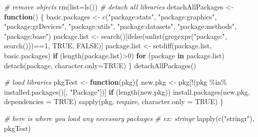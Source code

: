 \documentclass[
]{article}
\newenvironment{Shaded}{\begin{snugshade}}{\end{snugshade}}
\newcommand{\AttributeTok}[1]{\textcolor[rgb]{0.77,0.63,0.00}{#1}}
\newcommand{\CommentTok}[1]{\textcolor[rgb]{0.56,0.35,0.01}{\textit{#1}}}
\newcommand{\ConstantTok}[1]{\textcolor[rgb]{0.00,0.00,0.00}{#1}}
\newcommand{\ControlFlowTok}[1]{\textcolor[rgb]{0.13,0.29,0.53}{\textbf{#1}}}
\newcommand{\DecValTok}[1]{\textcolor[rgb]{0.00,0.00,0.81}{#1}}
\newcommand{\FunctionTok}[1]{\textcolor[rgb]{0.00,0.00,0.00}{#1}}
\newcommand{\NormalTok}[1]{#1}
\newcommand{\OtherTok}[1]{\textcolor[rgb]{0.56,0.35,0.01}{#1}}
\newcommand{\SpecialCharTok}[1]{\textcolor[rgb]{0.00,0.00,0.00}{#1}}
\newcommand{\StringTok}[1]{\textcolor[rgb]{0.31,0.60,0.02}{#1}}
\begin{document}
\begin{Shaded}
\begin{Highlighting}[]
\CommentTok{\# remove objects}
\FunctionTok{rm}\NormalTok{(}\AttributeTok{list=}\FunctionTok{ls}\NormalTok{())}
\CommentTok{\# detach all libraries}
\NormalTok{detachAllPackages }\OtherTok{\textless{}{-}} \ControlFlowTok{function}\NormalTok{() \{}
\NormalTok{  basic.packages }\OtherTok{\textless{}{-}} \FunctionTok{c}\NormalTok{(}\StringTok{"package:stats"}\NormalTok{, }\StringTok{"package:graphics"}\NormalTok{, }\StringTok{"package:grDevices"}\NormalTok{, }\StringTok{"package:utils"}\NormalTok{, }\StringTok{"package:datasets"}\NormalTok{, }\StringTok{"package:methods"}\NormalTok{, }\StringTok{"package:base"}\NormalTok{)}
\NormalTok{  package.list }\OtherTok{\textless{}{-}} \FunctionTok{search}\NormalTok{()[}\FunctionTok{ifelse}\NormalTok{(}\FunctionTok{unlist}\NormalTok{(}\FunctionTok{gregexpr}\NormalTok{(}\StringTok{"package:"}\NormalTok{, }\FunctionTok{search}\NormalTok{()))}\SpecialCharTok{==}\DecValTok{1}\NormalTok{, }\ConstantTok{TRUE}\NormalTok{, }\ConstantTok{FALSE}\NormalTok{)]}
\NormalTok{  package.list }\OtherTok{\textless{}{-}} \FunctionTok{setdiff}\NormalTok{(package.list, basic.packages)}
  \ControlFlowTok{if}\NormalTok{ (}\FunctionTok{length}\NormalTok{(package.list)}\SpecialCharTok{\textgreater{}}\DecValTok{0}\NormalTok{)  }\ControlFlowTok{for}\NormalTok{ (package }\ControlFlowTok{in}\NormalTok{ package.list) }\FunctionTok{detach}\NormalTok{(package,  }\AttributeTok{character.only=}\ConstantTok{TRUE}\NormalTok{)}
\NormalTok{\}}
\FunctionTok{detachAllPackages}\NormalTok{()}

\CommentTok{\# load libraries}
\NormalTok{pkgTest }\OtherTok{\textless{}{-}} \ControlFlowTok{function}\NormalTok{(pkg)\{}
\NormalTok{  new.pkg }\OtherTok{\textless{}{-}}\NormalTok{ pkg[}\SpecialCharTok{!}\NormalTok{(pkg }\SpecialCharTok{\%in\%} \FunctionTok{installed.packages}\NormalTok{()[,  }\StringTok{"Package"}\NormalTok{])]}
  \ControlFlowTok{if}\NormalTok{ (}\FunctionTok{length}\NormalTok{(new.pkg)) }
    \FunctionTok{install.packages}\NormalTok{(new.pkg,  }\AttributeTok{dependencies =} \ConstantTok{TRUE}\NormalTok{)}
  \FunctionTok{sapply}\NormalTok{(pkg,  require,  }\AttributeTok{character.only =} \ConstantTok{TRUE}\NormalTok{)}
\NormalTok{\}}

\CommentTok{\# here is where you load any necessary packages}
\CommentTok{\# ex: stringr}
 \FunctionTok{lapply}\NormalTok{(}\FunctionTok{c}\NormalTok{(}\StringTok{"stringr"}\NormalTok{),  pkgTest)}
\end{Highlighting}
\end{Shaded}
\end{document}
